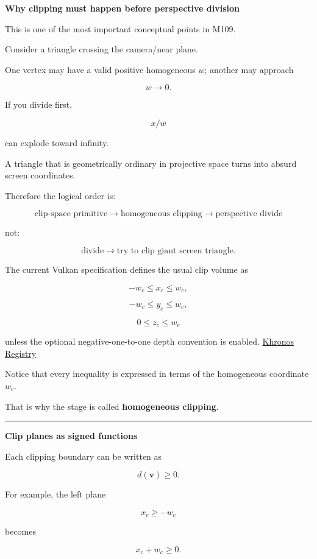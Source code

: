 \textbf{Why clipping must happen before perspective division}

This is one of the most important conceptual points in M109.

Consider a triangle crossing the camera/near plane.

One vertex may have a valid positive homogeneous \(w\); another may approach

\[
w\rightarrow0.
\]

If you divide first,

\[
x/w
\]

can explode toward infinity.

A triangle that is geometrically ordinary in projective space turns into absurd screen coordinates.

Therefore the logical order is:

\[
\boxed{
\text{clip-space primitive}
\rightarrow
\text{homogeneous clipping}
\rightarrow
\text{perspective divide}
}
\]

not:

\[
\text{divide}
\rightarrow
\text{try to clip giant screen triangle}.
\]

The current Vulkan specification defines the usual clip volume as

\[
-w_c\le x_c\le w_c,
\]

\[
-w_c\le y_c\le w_c,
\]

\[
0\le z_c\le w_c
\]

unless the optional negative-one-to-one depth convention is enabled. \href{https://registry.khronos.org/vulkan/specs/latest-ratified/pdf/vkspec.pdf?utm_source=chatgpt.com}{Khronos Registry}

Notice that every inequality is expressed in terms of the homogeneous coordinate \(w_c\).

That is why the stage is called \textbf{homogeneous clipping}.

\begin{center}\rule{0.5\linewidth}{0.5pt}\end{center}

\textbf{Clip planes as signed functions}

Each clipping boundary can be written as

\[
d(\mathbf v)\ge0.
\]

For example, the left plane

\[
x_c\ge-w_c
\]

becomes

\[
x_c+w_c\ge0.
\]

